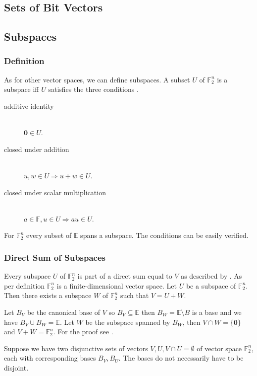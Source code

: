 \documentclass[a4paper]{article}
\newcommand{\BE}{\mathbb{E}}
\newcommand{\BF}{\mathbb{F}}
\newcommand{\0}{\mathbf{0}}
\newcommand{\1}{\mathbf{1}}
\begin{document}
\subsection{Sets of Bit Vectors}

\subsection{Subspaces}

\subsubsection{Definition}
As for other vector spaces, we can define subspaces. A subset $U$ of $\BF_2^n$ is a subspace iff 
$U$ satisfies the three conditions \cite[Theorem 1.34]{Axler2024}.
\begin{description}
\item[additive identity] \ \\
	$\0 \in U$.
\item[closed under addition] \ \\
	$u, w \in U \Rightarrow u + w \in U$.
\item[closed under scalar multiplication] \ \\
	$a \in \BF, u \in U \Rightarrow a u \in U$.
\end{description}

For $\BF_2^n$ every subset of $\BE$ spans a subspace. The conditions can be easily verified. 

\subsubsection{Direct Sum of Subspaces}

Every subspace $U$ of $\BF_2^n$ is part of a direct sum equal to $V$ as described by \cite[Theorem 2.33]{Axler2024}.
As per definition $\BF_2^n$ is a finite-dimensional vector space. Let $U$ be a subspace of $\BF_2^n$. Then there exists a
subspace $W$ of $\BF_2^n$ such that $V = U + W$. 

Let $B_V$ be the canonical base of $V$ so $B_V \subseteq \BE$ then $B_W= \BE \setminus B$ is a base and we have
$B_V \cup B_W = \BE$.
Let $W$ be the subspace spanned by $B_W$, then $V \cap W = \{\0\}$ and $V + W = \BF_2^n$. For the proof see \cite{Axler2024}.

Suppose we have two disjunctive sets of vectors $V, U, V \cap U = \emptyset$ of vector space $\BF_2^n$,
each with corresponding bases $B_V, B_U$. The bases do not necessarily have to be disjoint.
\end{document}

